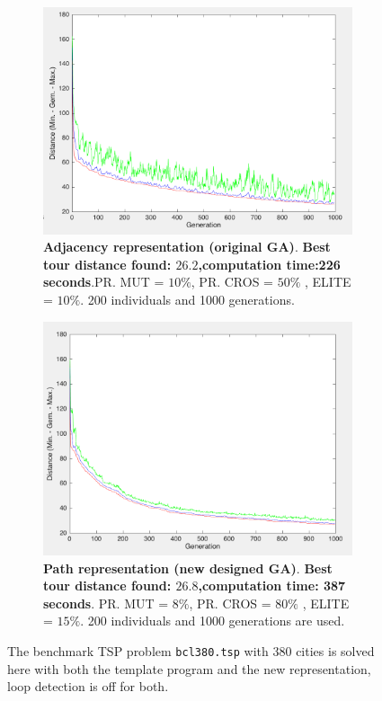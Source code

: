 \begin{figure}[!]
\centering
\begin{subfigure}{0.45\textwidth}
  \centering
    \includegraphics[width=1\textwidth]{../figures/figures_question_4/adj_vraag4_on_gen}
      \caption{\textbf{Adjacency representation (original GA)}. \textbf{Best tour distance found: $\mathbf{26.2}$,computation time:226 seconds}.PR. MUT = $10\%$, PR. CROS = $50\%$ , ELITE = $10\%$. 200 individuals and 1000 generations.}
      \label{fig:adj_vraag4_on_gen}
\end{subfigure}%
\hspace{0.05\textwidth}
\begin{subfigure}{0.45\textwidth}
  \centering
    \includegraphics[width=1\textwidth]{../figures/figures_question_4/path_vraag4_on_gen}
      \caption{\textbf{Path representation (new designed GA)}. \textbf{Best tour distance found:  $\mathbf{26.8}$,computation time: 387 seconds}. PR. MUT = $8\%$, PR. CROS = $80\%$ , ELITE = $15\%$. 200 individuals and 1000 generations are used.}
      \label{fig:path_vraag4_on_gen}
\end{subfigure}
\caption{The benchmark TSP problem \texttt{bcl380.tsp} with 380 cities is solved here with both the template program and the new representation, loop detection is off for both.}
\label{fig:tour380_on}
\end{figure}

